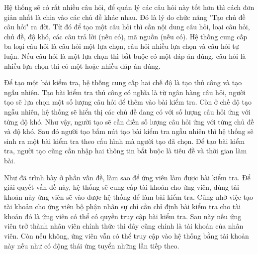 \documentclass[../DoAn.tex]{subfiles}
\begin{document}
Hệ thống sẽ có rất nhiều câu hỏi, để quản lý các câu hỏi này tốt hơn thì cách đơn giản nhất là chia vào các chủ đề khác nhau. Đó là lý do chức năng "Tạo chủ đề câu hỏi" ra đời. Từ đó để tạo một câu hỏi thì cần nội dung câu hỏi, loại câu hỏi, chủ đề, độ khó, các câu trả lời (nếu có), mã nguồn (nếu có). Hệ thống cung cấp ba loại câu hỏi là câu hỏi một lựa chọn, câu hỏi nhiều lựa chọn và câu hỏi tự luận. Nếu câu hỏi là một lựa chọn thì bắt buộc có một đáp án đúng, câu hỏi là nhiều lựa chọn thì có một hoặc nhiều đáp án đúng.

Để tạo một bài kiểm tra, hệ thống cung cấp hai chế độ là tạo thủ công và tạo ngẫu nhiên. Tạo bài kiểm tra thủ công có nghĩa là từ ngân hàng câu hỏi, người tạo sẽ lựa chọn một số lượng câu hỏi để thêm vào bài kiểm tra. Còn ở chế độ tạo ngẫu nhiên, hệ thống sẽ hiển thị các chủ đề đang có với số lượng câu hỏi ứng với từng độ khó. Như vậy, người tạo sẽ cần điền số lượng câu hỏi ứng với từng chủ đề và độ khó. Sau đó người tạo bấm nút tạo bài kiểm tra ngẫu nhiên thì hệ thống sẽ sinh ra một bài kiểm tra theo cấu hình mà người tạo đã chọn. Để tạo bài kiểm tra, người tạo cũng cần nhập hai thông tin bắt buộc là tiêu đề và thời gian làm bài.

Như đã trình bày ở phần vấn đề, làm sao để ứng viên làm được bài kiểm tra. Để giải quyết vấn đề này, hệ thống sẽ cung cấp tài khoản cho ứng viên, dùng tài khoản này ứng viên sẽ vào được hệ thống để làm bài kiểm tra. Cũng nhờ việc tạo tài khoản cho ứng viên bộ phận nhân sự chỉ cần chỉ định bài kiểm tra cho tài khoản đó là ứng viên có thể có quyền truy cập bài kiểm tra. Sau này nếu ứng viên trở thành nhân viên chính thức thì đây cũng chính là tài khoản của nhân viên. Còn nếu không, ứng viên vẫn có thể truy cập vào hệ thống bằng tài khoản này nếu như có động thái ứng tuyển những lần tiếp theo.
\end{document}

